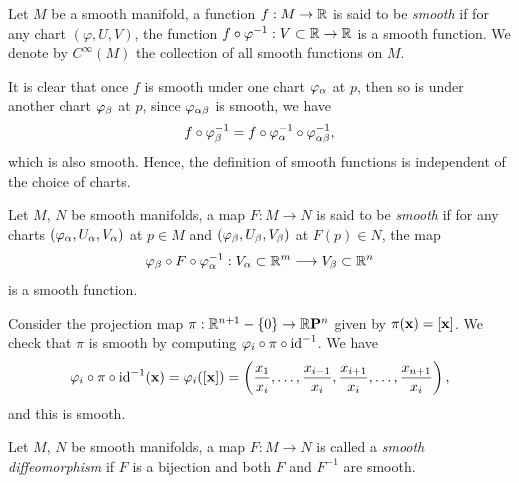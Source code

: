 \begin{definition}
  Let \(M\) be a smooth manifold, a function \(f:M\to\mathbb{R}\) is said to be \emph{smooth} if for any chart \((\varphi,U,V)\), the function \(f\circ\varphi^{-1}:V\subset\mathbb{R}\to\mathbb{R}\) is a smooth function. We denote by \(C^\infty(M)\) the collection of all smooth functions on \(M\).
\end{definition}

\begin{center}
  
\end{center}

It is clear that once \(f\) is smooth under one chart \(\varphi_\alpha\) at \(p\), then so is under another chart \(\varphi_\beta\) at \(p\), since \(\varphi_{\alpha\beta}\) is smooth, we have \[
  f\circ\varphi_\beta^{-1} = f\circ\varphi_\alpha^{-1}\circ\varphi_{\alpha\beta}^{-1},
\] which is also smooth. Hence, the definition of smooth functions is independent of the choice of charts.

\begin{definition}
  Let \(M\), \(N\) be smooth manifolds, a map \(F:M\to N\) is said to be \emph{smooth} if for any charts \((\varphi_\alpha,U_\alpha,V_\alpha)\) at \(p\in M\) and \((\varphi_\beta,U_\beta,V_\beta)\) at \(F(p)\in N\), the map \[
    \varphi_\beta\circ F\circ\varphi_\alpha^{-1}:V_\alpha\subset\mathbb{R}^m\longrightarrow V_\beta\subset\mathbb{R}^n
  \] is a smooth function.
\end{definition}

\begin{center}
  
\end{center}

\begin{example}
  Consider the projection map \(\pi:\mathbb{R}^{n+1}\mathbin{-}\{0\}\to\mathbb{R}\mathbf{P}^n\) given by \(\pi(\mathbf{x}) = [\mathbf{x}]\). We check that \(\pi\) is smooth by computing \(\varphi_i\circ\pi\circ\mathrm{id}^{-1}\). We have \begin{align*}
    \varphi_i\circ\pi\circ\mathrm{id}^{-1}(\mathbf{x})
    = \varphi_i([\mathbf{x}])
    = \left(\frac{x_1}{x_i},\ldots,\frac{x_{i-1}}{x_i},\frac{x_{i+1}}{x_i},\ldots,\frac{x_{n+1}}{x_i}\right),
  \end{align*} and this is smooth.
\end{example}

\begin{definition}
  Let \(M\), \(N\) be smooth manifolds, a map \(F:M\to N\) is called a \emph{smooth diffeomorphism} if \(F\) is a bijection and both \(F\) and \(F^{-1}\) are smooth.
\end{definition}

